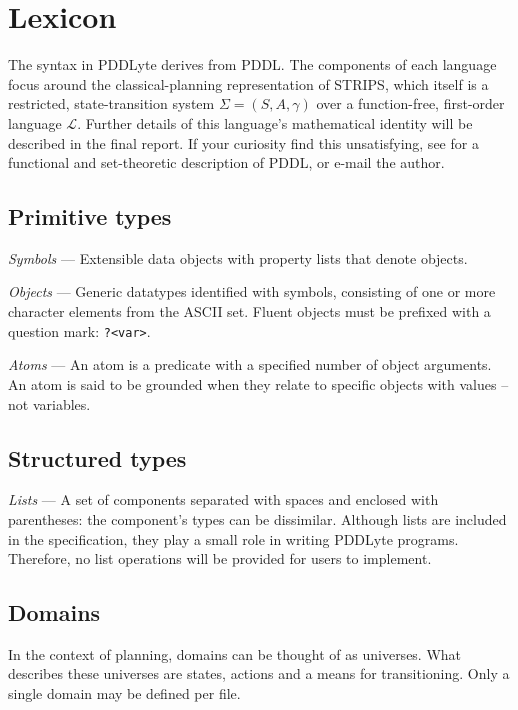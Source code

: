 \documentclass[
a4paper, %
11pt, %
onecolumn, %
openany, %
]{memoir}
\begin{document}
{\begin{center}
\begin{tikzpicture}[->,>=stealth']

\end{tikzpicture}
\end{center}


\section{Lexicon}

The syntax in PDDLyte derives from PDDL. The components of each language focus around the classical-planning representation of STRIPS, which itself is a restricted, state-transition system $\Sigma = (S,A,\gamma)$ over a function-free, first-order language $\mathcal{L}$. Further details of this language's mathematical identity will be described in the final report. If your curiosity find this unsatisfying, see \cite{auto_planning} for a functional and set-theoretic description of PDDL, or e-mail the author.\\
\subsection{Primitive types}

\textit{Symbols} --- Extensible data objects with property lists that denote objects.

\textit{Objects} --- Generic datatypes identified with symbols, consisting of one or more character elements from the ASCII set. Fluent objects must be prefixed with a question mark: \texttt{?<var>}.

\textit{Atoms} --- An atom is a predicate with a specified number of object arguments. An atom is said to be grounded when they relate to specific objects with values -- not variables.

\subsection{Structured types}

\textit{Lists} --- A set of components separated with spaces and enclosed with parentheses: the component's types can be dissimilar. Although lists are included in the specification, they play a small role in writing PDDLyte programs. Therefore, no list operations will be provided for users to implement.

\subsection{Domains} 
In the context of planning, domains can be thought of as universes. What describes these universes are states, actions and a means for transitioning. Only a single domain may be defined per file. 

}
\end{document}
